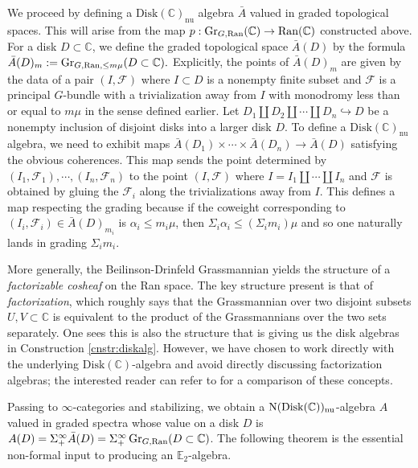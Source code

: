 \begin{cnstr}\label{cnstr:diskalg}
We proceed by defining a $\mathrm{Disk}(\mathbb{C})_{\mathrm{nu}}$ algebra $\bar{A}$ valued in graded topological spaces.  This will arise from the map $p:\operatorname{\mathrm{Gr}}_{G,\operatorname{\mathrm{Ran}}}(\mathbb{C}) \to \operatorname{\mathrm{Ran}}(\mathbb{C})$ constructed above.  For a disk $D\subset \mathbb{C}$, we define the graded topological space $\bar{A}(D)$ by the formula $\bar{A}(D)_m := \operatorname{\mathrm{Gr}}_{G,\operatorname{\mathrm{Ran}}, \leq m\mu}(D\subset \mathbb{C}).$  Explicitly, the points of $\bar{A}(D)_m$ are given by the data of a pair $(I, \mathcal{F})$ where $I\subset D$ is a nonempty finite subset and $\mathcal{F}$ is a principal $G$-bundle with a trivialization away from $I$ with monodromy less than or equal to $m\mu$ in the sense defined earlier.  Let $D_1 \coprod D_2\coprod \cdots \coprod D_n \hookrightarrow D$ be a nonempty inclusion of disjoint disks into a larger disk $D$.  To define a $\mathrm{Disk}(\mathbb{C})_{\mathrm{nu}}$ algebra, we need to exhibit maps $\bar{A}(D_1)\times \cdots \times \bar{A}(D_n) \to \bar{A}(D)$ satisfying the obvious coherences.  %
This map sends the point determined by $(I_1, \mathcal{F}_1), \cdots, (I_n, \mathcal{F}_n)$ to the point $(I, \mathcal{F})$ where $I= I_1 \coprod \cdots \coprod I_n$ and $\mathcal{F}$ is obtained by gluing the $\mathcal{F}_i$ along the trivializations away from $I$.  This defines a map respecting the grading because if the coweight corresponding to $(I_i,\mathcal{F}_i) \in \bar{A}(D)_{m_i}$ is $\alpha_i\leq m_i \mu$, then $\Sigma_i \alpha_i \leq (\Sigma_i m_i) \mu$ and so one naturally lands in grading $\Sigma_i m_i$.  
\end{cnstr}
\begin{rmk}
More generally, the Beilinson-Drinfeld Grassmannian yields the structure of a \emph{factorizable cosheaf} on the Ran space.  The key structure present is that of \emph{factorization}, which roughly says that the Grassmannian over two disjoint subsets $U,V\subset \mathbb{C}$ is equivalent to the product of the Grassmannians over the two sets separately.  One sees this is also the structure that is giving us the disk algebras in Construction \ref{cnstr:diskalg}.  However, we have chosen to work directly with the underlying $\mathrm{Disk}(\mathbb{C})$-algebra and avoid directly discussing factorization algebras; the interested reader can refer to \cite[\S 5.5.4.10]{HA} for a comparison of these concepts.  
\end{rmk}

Passing to $\infty$-categories and stabilizing, we obtain a $\operatorname{\mathrm{N}}(\mathrm{Disk}(\mathbb{C}))_{\mathrm{nu}}$-algebra $A$ valued in graded spectra whose value on a disk $D$ is $A(D) = \Sigma^{\infty}_+ \bar{A}(D) = \Sigma^{\infty}_+ \operatorname{\mathrm{Gr}}_{G,\operatorname{\mathrm{Ran}}}(D\subset \mathbb{C})$.  The following theorem is the essential non-formal input to producing an $\mathbb{E}_2$-algebra.  

